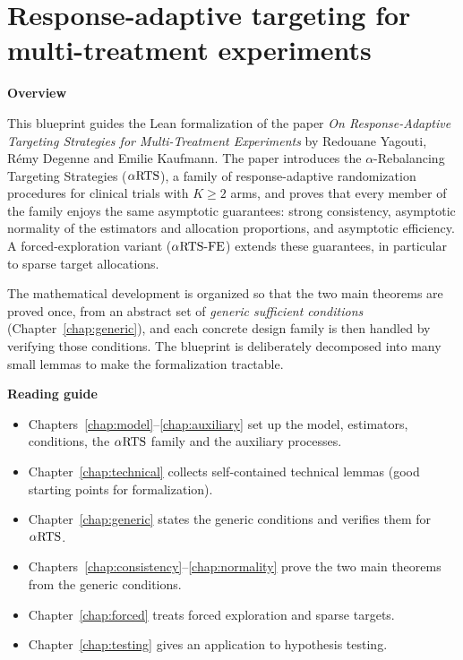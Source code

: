 %

\part{Response-adaptive targeting for multi-treatment experiments}

\textbf{Overview}

This blueprint guides the Lean formalization of the paper
\emph{On Response-Adaptive Targeting Strategies for Multi-Treatment Experiments}
by Redouane Yagouti, Rémy Degenne and Emilie Kaufmann. The paper introduces the
$\alpha$-Rebalancing Targeting Strategies ($\alpha\text{RTS}$), a family of response-adaptive
randomization procedures for clinical trials with $K \geq 2$ arms, and proves
that every member of the family enjoys the same asymptotic guarantees: strong
consistency, asymptotic normality of the estimators and allocation proportions,
and asymptotic efficiency. A forced-exploration variant ($\alpha\text{RTS-FE}$) extends these
guarantees, in particular to sparse target allocations.

The mathematical development is organized so that the two main theorems are
proved once, from an abstract set of \emph{generic sufficient conditions}
(Chapter~\ref{chap:generic}), and each concrete design family is then handled by
verifying those conditions. The blueprint is deliberately decomposed into many
small lemmas to make the formalization tractable.

\textbf{Reading guide}
\begin{itemize}
  \item Chapters~\ref{chap:model}--\ref{chap:auxiliary} set up the model,
        estimators, conditions, the $\alpha\text{RTS}$ family and the auxiliary processes.
  \item Chapter~\ref{chap:technical} collects self-contained technical lemmas
        (good starting points for formalization).
  \item Chapter~\ref{chap:generic} states the generic conditions and verifies
        them for $\alpha\text{RTS}$.
  \item Chapters~\ref{chap:consistency}--\ref{chap:normality} prove the two main
        theorems from the generic conditions.
  \item Chapter~\ref{chap:forced} treats forced exploration and sparse targets.
  \item Chapter~\ref{chap:testing} gives an application to hypothesis testing.
\end{itemize}

